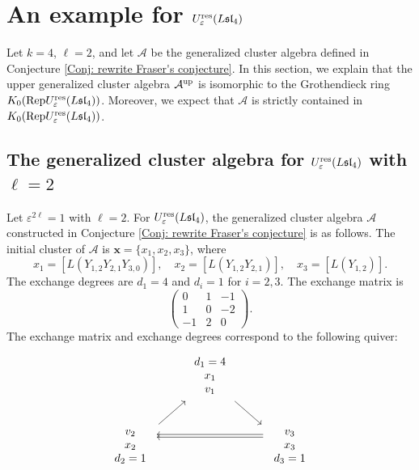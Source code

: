 \documentclass[11pt, reqno]{amsart}
\theoremstyle{plain}
\theoremstyle{definition}
\numberwithin{equation}{section}
\newcommand{\res}{{\rm res}}
\newcommand{\Rep}{{\rm Rep}}
\begin{document}
\section{\texorpdfstring{An example for $U_\varepsilon^{\res}(L\mathfrak{sl}_4)$}{An example in type A3}} \label{sec:example in type A3}

Let $k=4$, $\ell=2$, and let $\mathcal{A}$ be the generalized cluster algebra defined in Conjecture \ref{Conj: rewrite Fraser's conjecture}. In this section, we explain that the upper generalized cluster algebra $\mathcal{A}^{\rm up}$ is isomorphic to the Grothendieck ring $K_0(\Rep U_\varepsilon^{\res}(L\mathfrak{sl}_4))$. Moreover, we expect that $\mathcal{A}$ is strictly contained in $K_0(\Rep U_\varepsilon^{\res}(L\mathfrak{sl}_4))$.

\subsection{\texorpdfstring{The generalized cluster algebra for $U_\varepsilon^{\res}(L\mathfrak{sl}_4)$ with $\ell=2$}{The generalized cluster algebra for A3 and l=2}}\label{sub:The generalized cluster algebra for A_3}
Let $\varepsilon^{2 \ell}=1$ with $\ell=2$. For $U_\varepsilon^{\res}(L\mathfrak{sl}_4)$, the generalized cluster algebra $\mathcal{A}$ constructed in Conjecture \ref{Conj: rewrite Fraser's conjecture} is as follows. The initial cluster of $\mathcal{A}$ is $\mathbf{x}=\{x_1,x_2,x_3\}$, where
\[
x_1=[L(Y_{1,2}Y_{2,1}Y_{3,0})],\quad x_2=[L(Y_{1,2}Y_{2,1})],\quad x_3=[L(Y_{1,2})].
\]
The exchange degrees are $d_1=4$ and $d_i=1$ for $i=2,3$. The exchange matrix is
\begin{equation*}
\left(\begin{array}{ccc}
0&1&-1\\
1&0&-2\\
-1&2&0
\end{array} \right).
\end{equation*}
The exchange matrix and exchange degrees correspond to the following quiver:
\[\begin{tikzcd}
	& \begin{array}{c} d_1=4\\x_1\\v_1 \end{array} & \\
	\begin{array}{c} v_2\\x_2\\d_2=1 \end{array} && \begin{array}{c} v_3\\x_3\\d_3=1 \end{array}
	\arrow[shift right, from=1-2, to=2-3]
	\arrow[shift right, from=2-1, to=1-2]
	\arrow[shift right=3, from=2-3, to=2-1]
	\arrow[shift right=4, from=2-3, to=2-1]
\end{tikzcd}\]
\end{document}
